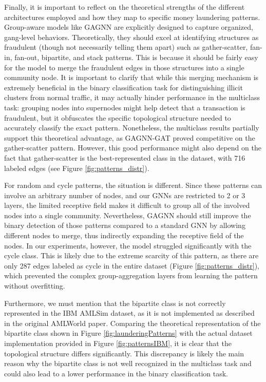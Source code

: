 Finally, it is important to reflect on the theoretical strengths of the different architectures employed and how they map to specific money laundering patterns. Group-aware models like GAGNN are explicitly designed to capture organized, gang-level behaviors. Theoretically, they should excel at identifying structures as fraudulent (though not necessarily telling them apart) such as gather-scatter, fan-in, fan-out, bipartite, and stack patterns. This is because it should be fairly easy for the model to merge the fraudulent edges in those structures into a single community node. It is important to clarify that while this merging mechanism is extremely beneficial in the binary classification task for distinguishing illicit clusters from normal traffic, it may actually hinder performance in the multiclass task: grouping nodes into supernodes might help detect that a transaction is fraudulent, but it obfuscates the specific topological structure needed to accurately classify the exact pattern. Nonetheless, the multiclass results partially support this theoretical advantage, as GAGNN-GAT proved competitive on the gather-scatter pattern. However, this good performance might also depend on the fact that gather-scatter is the best-represented class in the dataset, with 716 labeled edges (see Figure \ref{fig:patterns_distr}).

For random and cycle patterns, the situation is different. Since these patterns can involve an arbitrary number of nodes, and our GNNs are restricted to 2 or 3 layers, the limited receptive field makes it difficult to group all of the involved nodes into a single community. Nevertheless, GAGNN should still improve the binary detection of those patterns compared to a standard GNN by allowing different nodes to merge, thus indirectly expanding the receptive field of the nodes. In our experiments, however, the model struggled significantly with the cycle class. This is likely due to the extreme scarcity of this pattern, as there are only 287 edges labeled as cycle in the entire dataset (Figure \ref{fig:patterns_distr}), which prevented the complex group-aggregation layers from learning the pattern without overfitting.

Furthermore, we must mention that the bipartite class is not correctly represented in the IBM AMLSim dataset, as it is not implemented as described in the original AMLWorld paper. Comparing the theoretical representation of the bipartite class shown in Figure \ref{fig:launderingPatterns} with the actual dataset implementation provided in Figure \ref{fig:patternsIBM}, it is clear that the topological structure differs significantly. This discrepancy is likely the main reason why the bipartite class is not well recognized in the multiclass task and could also lead to a lower performance in the binary classification task.

